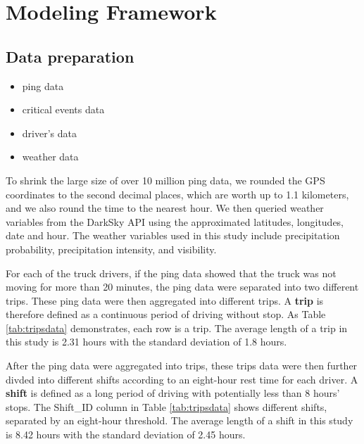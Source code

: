 \documentclass[]{elsarticle} %
\providecommand{\tightlist}{%
  \setlength{\itemsep}{0pt}\setlength{\parskip}{0pt}}
\begin{document}
\hypertarget{modeling-framework}{%
\section{Modeling Framework}\label{modeling-framework}}

\hypertarget{data-preparation}{%
\subsection{Data preparation}\label{data-preparation}}

\begin{itemize}
\tightlist
\item
  ping data
\item
  critical events data
\item
  driver's data
\item
  weather data
\end{itemize}

To shrink the large size of over 10 million ping data, we rounded the GPS coordinates to the second decimal places, which are worth up to 1.1 kilometers, and we also round the time to the nearest hour. We then queried weather variables from the DarkSky API using the approximated latitudes, longitudes, date and hour. The weather variables used in this study include precipitation probability, precipitation intensity, and visibility.

For each of the truck drivers, if the ping data showed that the truck was not moving for more than 20 minutes, the ping data were separated into two different trips. These ping data were then aggregated into different trips. A \textbf{trip} is therefore defined as a continuous period of driving without stop. As Table \ref{tab:tripsdata} demonstrates, each row is a trip. The average length of a trip in this study is 2.31 hours with the standard deviation of 1.8 hours.

After the ping data were aggregated into trips, these trips data were then further divded into different shifts according to an eight-hour rest time for each driver. A \textbf{shift} is defined as a long period of driving with potentially less than 8 hours' stops. The Shift\_ID column in Table \ref{tab:tripsdata} shows different shifts, separated by an eight-hour threshold. The average length of a shift in this study is 8.42 hours with the standard deviation of 2.45 hours.
\end{document}
